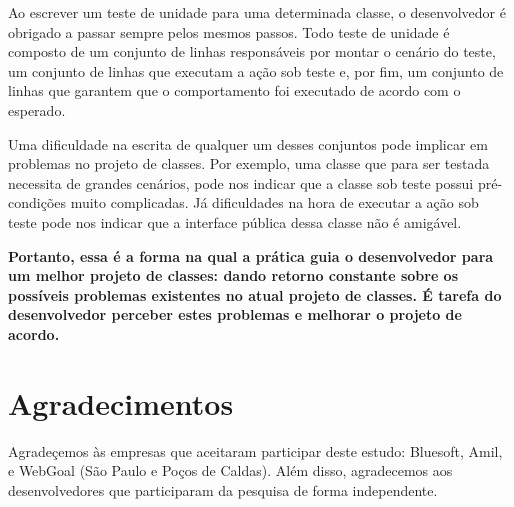\documentclass[conference]{IEEEtran}
\begin{document}
Ao escrever um teste de unidade para uma determinada classe, o desenvolvedor
é obrigado a passar sempre pelos mesmos passos. Todo teste de unidade é composto
de um conjunto de linhas responsáveis por montar o cenário do teste, um conjunto
de linhas que executam a ação sob teste e, por fim, um conjunto de linhas que
garantem que o comportamento foi executado de acordo com o esperado.

Uma dificuldade na escrita de qualquer um desses conjuntos pode implicar
em problemas no projeto de classes. Por exemplo, uma classe que para
ser testada necessita de grandes cenários, pode nos indicar que a classe
sob teste possui pré-condições muito complicadas. Já dificuldades na hora
de executar a ação sob teste pode nos indicar que a interface pública dessa
classe não é amigável. 

\textbf{Portanto, essa é a forma na qual a prática guia o desenvolvedor para
um melhor projeto de classes: dando retorno constante sobre os possíveis problemas
existentes no atual projeto de classes. É tarefa do desenvolvedor perceber
estes problemas e melhorar o projeto de acordo.}

\section*{Agradecimentos}

Agradeçemos às empresas que aceitaram participar deste estudo: Bluesoft,
Amil, e WebGoal (São Paulo e Poços de Caldas). Além disso, agradecemos aos
desenvolvedores que participaram da pesquisa de forma independente.


\footnotesize{}

\end{document}
